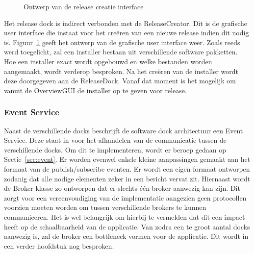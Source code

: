 \begin{figure}[!ht]
\centering
{}
\caption{Ontwerp van de release creatie interface}
\label{fig:releaseCreator}
\end{figure}

Het release dock is indirect verbonden met de ReleaseCreator.
Dit is de grafische user interface die instaat voor het creëren van een nieuwe release indien dit nodig is.
Figuur~\ref{fig:releaseCreator} geeft het ontwerp van de grafische user interface weer.
Zoals reeds werd toegelicht, zal een installer bestaan uit verschillende software pakketten.
Hoe een installer exact wordt opgebouwd en welke bestanden worden aangemaakt, wordt verderop besproken.
Na het creëren van de installer wordt deze doorgegeven aan de ReleaseDock.
Vanaf dat moment is het mogelijk om vanuit de OverviewGUI de installer op te geven voor release.

\subsubsection{Event Service}
Naast de verschillende docks beschrijft de software dock architectuur een Event Service.
Deze staat in voor het afhandelen van de communicatie tussen de verschillende docks.
Om dit te implementeren, wordt er beroep gedaan op Sectie~\vref{sec:event}.
Er worden evenwel enkele kleine aanpassingen gemaakt aan het formaat van de publish/subscribe eventen.
Er wordt een eigen formaat ontworpen zodanig dat alle nodige elementen zeker in een bericht vervat zit.
Hiernaast wordt de Broker klasse zo ontworpen dat er slechts één broker aanwezig kan zijn.
Dit zorgt voor een vereenvoudiging van de implementatie aangezien geen protocollen voorzien moeten worden om tussen verschillende brokers te kunnen communiceren.
Het is wel belangrijk om hierbij te vermelden dat dit een impact heeft op de schaalbaarheid van de applicatie.
Van zodra een te groot aantal docks aanwezig is, zal de broker een bottleneck vormen voor de applicatie.
Dit wordt in een verder hoofdstuk nog besproken.


